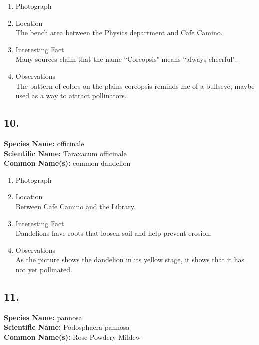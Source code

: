 \documentclass{article}
\begin{document}
\begin{enumerate}[label = \textbf{\arabic*)}]
	\item Photograph

	\item Location \\
		The bench area between the Physics department and Cafe Camino.
	\item Interesting Fact \\
		Many sources claim that the name ``Coreopsis" means ``always cheerful".
	\item Observations \\
		The pattern of colors on the plains coreopsis reminds me of a bullseye, maybe used as a way to attract pollinators.
\end{enumerate}

\subsection{10.}
\textbf{Species Name: } officinale \\
\textbf{Scientific Name: } Taraxacum officinale \\
\textbf{Common Name(s): } common dandelion

\begin{enumerate}[label = \textbf{\arabic*)}]
	\item Photograph

	\item Location \\
		Between Cafe Camino and the Library.
	\item Interesting Fact \\
		Dandelions have roots that loosen soil and help prevent erosion.
	\item Observations \\
		As the picture shows the dandelion in its yellow stage, it shows that it has not yet pollinated.
\end{enumerate}

\subsection{11.}
\textbf{Species Name: } pannosa \\
\textbf{Scientific Name: } Podosphaera pannosa \\
\textbf{Common Name(s): } Rose Powdery Mildew
\end{document}
